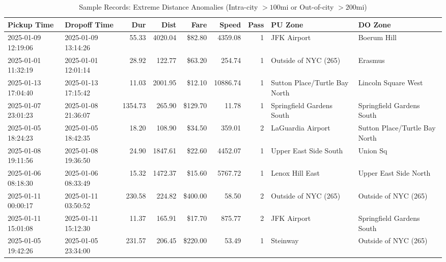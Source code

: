 \documentclass[11pt,a4paper]{article}
\begin{document}
\begin{table}[htbp]
\centering
\caption{Sample Records: Extreme Distance Anomalies (Intra-city $>100$mi or Out-of-city $>200$mi)}
\label{tab:sample_distance}
\tiny
\begin{tabularx}{\textwidth}{l l r r r r r X X}
\toprule
\textbf{Pickup Time} & \textbf{Dropoff Time} & \textbf{Dur} & \textbf{Dist} & \textbf{Fare} & \textbf{Speed} & \textbf{Pass} & \textbf{PU Zone} & \textbf{DO Zone} \\
\midrule
2025-01-09 12:19:06 & 2025-01-09 13:14:26 & 55.33 & 4020.04 & \$82.80 & 4359.08 & 1 & JFK Airport & Boerum Hill \\
2025-01-01 11:32:19 & 2025-01-01 12:01:14 & 28.92 & 122.77 & \$63.20 & 254.74 & 1 & Outside of NYC (265) & Erasmus \\
2025-01-13 17:04:40 & 2025-01-13 17:15:42 & 11.03 & 2001.95 & \$12.10 & 10886.74 & 1 & Sutton Place/Turtle Bay North & Lincoln Square West \\
2025-01-07 23:01:23 & 2025-01-08 21:36:07 & 1354.73 & 265.90 & \$129.70 & 11.78 & 1 & Springfield Gardens South & Springfield Gardens South \\
2025-01-05 18:24:23 & 2025-01-05 18:42:35 & 18.20 & 108.90 & \$34.50 & 359.01 & 2 & LaGuardia Airport & Sutton Place/Turtle Bay North \\
2025-01-08 19:11:56 & 2025-01-08 19:36:50 & 24.90 & 1847.61 & \$22.60 & 4452.07 & 1 & Upper East Side South & Union Sq \\
2025-01-06 08:18:30 & 2025-01-06 08:33:49 & 15.32 & 1472.37 & \$15.60 & 5767.72 & 1 & Lenox Hill East & Upper East Side North \\
2025-01-11 00:00:17 & 2025-01-11 03:50:52 & 230.58 & 224.82 & \$400.00 & 58.50 & 2 & Outside of NYC (265) & Outside of NYC (265) \\
2025-01-11 15:01:08 & 2025-01-11 15:12:30 & 11.37 & 165.91 & \$17.70 & 875.77 & 2 & JFK Airport & Springfield Gardens South \\
2025-01-05 19:42:26 & 2025-01-05 23:34:00 & 231.57 & 206.45 & \$220.00 & 53.49 & 1 & Steinway & Outside of NYC (265) \\
\bottomrule
\end{tabularx}
\end{table}
\end{document}
